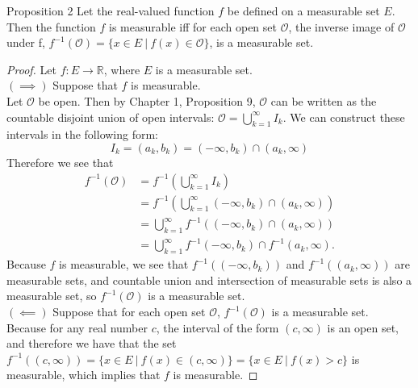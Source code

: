\begin{flushleft}
\begin{namedthm*}{Proposition 2}
    Let the real-valued function $f$ be defined on a measurable set $E$.
    Then the function $f$ is measurable iff for each open set $\mathcal{O}$, the inverse image of $\mathcal{O}$ under f, $f^{-1}(\mathcal{O})=\{x\in E\ |\ f(x)\in\mathcal{O}\}$, is a measurable set.
\end{namedthm*}
\begin{proof}
    Let $f:E\to\mathbb{R}$, where $E$ is a measurable set.\\
    $(\implies)$ Suppose that $f$ is measurable.\\
    Let $\mathcal{O}$ be open. Then by Chapter 1, Proposition 9, $\mathcal{O}$ can be written as the countable disjoint union of open intervals: $\mathcal{O}=\bigcup_{k=1}^\infty I_k$.
    We can construct these intervals in the following form:
    \[
        I_k=(a_k,b_k)=(-\infty,b_k)\cap(a_k,\infty)  
    \] 
    Therefore we see that
    \begin{align*}
        f^{-1}(\mathcal{O})&=f^{-1}(\bigcup_{k=1}^\infty I_k)\\
        &=f^{-1}(\bigcup_{k=1}^\infty (-\infty,b_k)\cap(a_k,\infty))\\
        &=\bigcup_{k=1}^\infty f^{-1}((-\infty,b_k)\cap(a_k,\infty))\\
        &=\bigcup_{k=1}^\infty f^{-1}(-\infty,b_k)\cap f^{-1}(a_k,\infty).
    \end{align*}
    Because $f$ is measurable, we see that $f^{-1}((-\infty,b_k))$ and $f^{-1}((a_k,\infty))$ are measurable sets, and countable union and intersection of measurable sets is also a measurable set, so $f^{-1}(\mathcal{O})$ is a measurable set.
    \\$(\impliedby)$ Suppose that for each open set $\mathcal{O}$, $f^{-1}(\mathcal{O})$ is a measurable set.\\
    Because for any real number $c$, the interval of the form $(c,\infty)$ is an open set, and therefore we have that the set $f^{-1}((c,\infty))=\{x\in E\ |\ f(x)\in(c,\infty)\}=\{x\in E\ |\ f(x)>c\}$ is measurable, which implies that $f$ is measurable.
\end{proof}


\end{flushleft}
